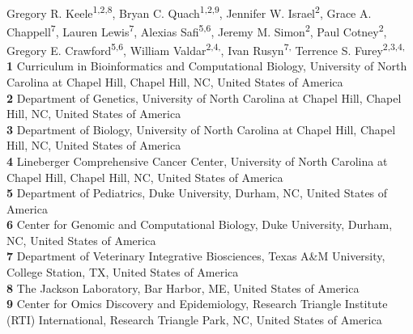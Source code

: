 \documentclass[10pt,letterpaper]{article}
\begin{document}
\vspace*{0.2in}

\begin{flushleft}
{\Large
\textbf{} %
}
\newline
\\
Gregory R. Keele\textsuperscript{1,2,8\Yinyang},
Bryan C. Quach\textsuperscript{1,2,9\Yinyang},
Jennifer W. Israel\textsuperscript{2},
Grace A. Chappell\textsuperscript{7},
Lauren Lewis\textsuperscript{7},
Alexias Safi\textsuperscript{5,6},
Jeremy M. Simon\textsuperscript{2},
Paul Cotney\textsuperscript{2},
Gregory E. Crawford\textsuperscript{5,6},
William Valdar\textsuperscript{2,4,\ddag*},
Ivan Rusyn\textsuperscript{7,\ddag*}
Terrence S. Furey\textsuperscript{2,3,4,\ddag*}
\\
\bigskip
\textbf{1} Curriculum in Bioinformatics and Computational Biology, University of North Carolina at Chapel Hill, Chapel Hill, NC, United States of America
\\
\textbf{2} Department of Genetics, University of North Carolina at Chapel Hill, Chapel Hill, NC, United States of America
\\
\textbf{3} Department of Biology, University of North Carolina at Chapel Hill, Chapel Hill, NC, United States of America
\\
\textbf{4} Lineberger Comprehensive Cancer Center, University of North Carolina at Chapel Hill, Chapel Hill, NC, United States of America
\\
\textbf{5} Department of Pediatrics, Duke University, Durham, NC, United States of America
\\
\textbf{6} Center for Genomic and Computational Biology, Duke University, Durham, NC, United States of America
\\
\textbf{7} Department of Veterinary Integrative Biosciences, Texas A\&M University, College Station, TX, United States of America
\\
\textbf{8} The Jackson Laboratory, Bar Harbor, ME, United States of America
\\
\textbf{9} Center for Omics Discovery and Epidemiology, Research Triangle Institute (RTI) International, Research Triangle Park, NC, United States of America
\\
\bigskip


\end{flushleft}
\end{document}
